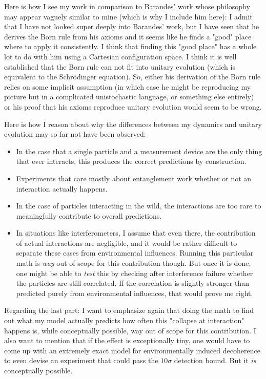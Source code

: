 \documentclass{article}
\begin{document}
Here is how I see my work in comparison to Barandes' work whose philosophy may appear vaguely similar to mine (which is why I include him here): I admit that I have not looked super deeply into Barandes' work, but I have seen that he derives the Born rule from his axioms and it seems like he finds a "good" place where to apply it consistently. I think that finding this "good place" has a whole lot to do with him using a Cartesian configuration space. I think it is well established that the Born rule can not fit into unitary evolution (which is equivalent to the Schrödinger equation). So, either his derivation of the Born rule relies on some implicit assumption (in which case he might be reproducing my picture but in a complicated unistochastic language, or something else entirely) or his proof that his axioms reproduce unitary evolution would seem to be wrong.

Here is how I reason about why the differences between my dynamics and unitary evolution may so far not have been observed:

\begin{itemize}
\item In the case that a single particle and a measurement device are the only thing that ever interacts, this produces the correct predictions by construction.

\item Experiments that care mostly about entanglement work whether or not an interaction actually happens. 

\item In the case of particles interacting in the wild, the interactions are too rare to meaningfully contribute to overall predictions.

\item In situations like interferometers, I assume that even there, the contribution of actual interactions are negligible, and it would be rather difficult to separate these cases from environmental influences. Running this particular math is \textit{way} out of scope for this contribution though. But once it is done, one might be able to \textit{test} this by checking after interference failure whether the particles are still correlated. If the correlation is slightly stronger than predicted purely from environmental influences, that would prove me right.
\end{itemize}

Regarding the last part: I want to emphasize again that doing the math to find out what my model actually predicts how often this "collapse at interaction" happens is, while conceptually possible, way out of scope for this contribution. I also want to mention that if the effect is exceptionally tiny, one would have to come up with an extremely exact model for environmentally induced decoherence to even devise an experiment that could pass the $10\sigma$ detection bound. But it \textit{is} conceptually possible.
\end{document}
